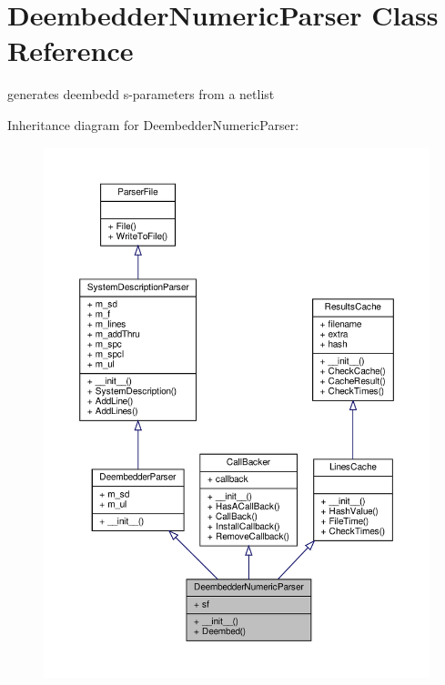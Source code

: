 \hypertarget{classSignalIntegrity_1_1Parsers_1_1DeembedderNumericParser_1_1DeembedderNumericParser}{}\section{Deembedder\+Numeric\+Parser Class Reference}
\label{classSignalIntegrity_1_1Parsers_1_1DeembedderNumericParser_1_1DeembedderNumericParser}


generates deembedd s-\/parameters from a netlist  




Inheritance diagram for Deembedder\+Numeric\+Parser\+:
\nopagebreak
\begin{figure}[H]
\begin{center}
\leavevmode
\includegraphics[width=350pt]{classSignalIntegrity_1_1Parsers_1_1DeembedderNumericParser_1_1DeembedderNumericParser__inherit__graph}
\end{center}
\end{figure}


